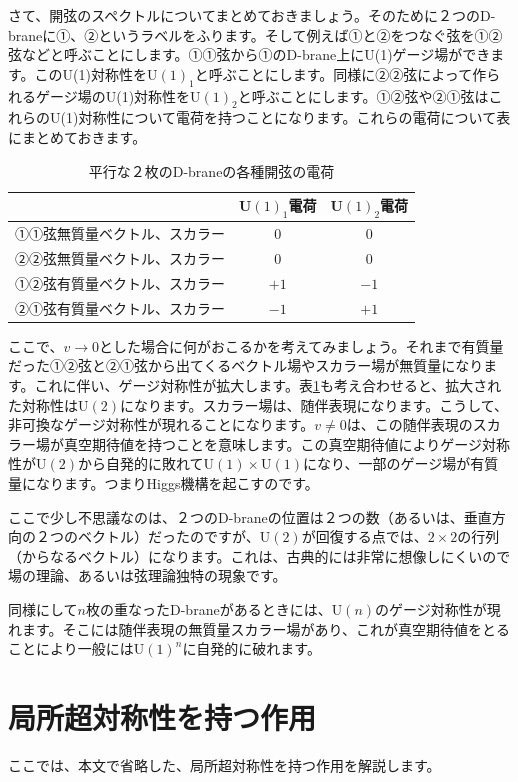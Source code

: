 \documentclass[report,paper=a4, fontsize=12pt, line_length=16cm, number_of_lines=33,dvipdfmx]{jlreq}
\numberwithin{equation}{chapter}
\numberwithin{equation}{section}
\begin{document}
さて、開弦のスペクトルについてまとめておきましょう。そのために２つのD-braneに①、②というラベルをふります。そして例えば①と②をつなぐ弦を①②弦などと呼ぶことにします。①①弦から①のD-brane上にU(1)ゲージ場ができます。このU(1)対称性をU$(1)_1$と呼ぶことにします。同様に②②弦によって作られるゲージ場のU(1)対称性をU$(1)_2$と呼ぶことにします。①②弦や②①弦はこれらのU(1)対称性について電荷を持つことになります。これらの電荷について表にまとめておきます。
\begin{table}
  \centering
  \begin{tabular}{|c|c|c|}\hline
    & U$(1)_1$電荷 & U$(1)_2$電荷\\ \hline
    ①①弦無質量ベクトル、スカラー & 0 & 0 \\ \hline
    ②②弦無質量ベクトル、スカラー & 0 & 0 \\ \hline
    ①②弦有質量ベクトル、スカラー & $+1$ & $-1$ \\ \hline
    ②①弦有質量ベクトル、スカラー & $-1$ & $+1$ \\ \hline
  \end{tabular}
  \caption{平行な２枚のD-braneの各種開弦の電荷}
  \label{tab:charges}
\end{table}

ここで、$v\to 0$とした場合に何がおこるかを考えてみましょう。それまで有質量だった①②弦と②①弦から出てくるベクトル場やスカラー場が無質量になります。これに伴い、ゲージ対称性が拡大します。表\ref{tab:charges}も考え合わせると、拡大された対称性はU$(2)$になります。スカラー場は、随伴表現になります。こうして、非可換なゲージ対称性が現れることになります。$v\ne 0$は、この随伴表現のスカラー場が真空期待値を持つことを意味します。この真空期待値によりゲージ対称性がU$(2)$から自発的に敗れてU$(1)\times $U$(1)$になり、一部のゲージ場が有質量になります。つまりHiggs機構を起こすのです。

ここで少し不思議なのは、２つのD-braneの位置は２つの数（あるいは、垂直方向の２つのベクトル）だったのですが、U$(2)$が回復する点では、$2\times 2$の行列（からなるベクトル）になります。これは、古典的には非常に想像しにくいので場の理論、あるいは弦理論独特の現象です。

同様にして$n$枚の重なったD-braneがあるときには、U$(n)$のゲージ対称性が現れます。そこには随伴表現の無質量スカラー場があり、これが真空期待値をとることにより一般にはU$(1)^n$に自発的に破れます。

\appendix
\chapter{局所超対称性を持つ作用}
\label{app:localSUSY}
ここでは、本文で省略した、局所超対称性を持つ作用を解説します。
\end{document}
